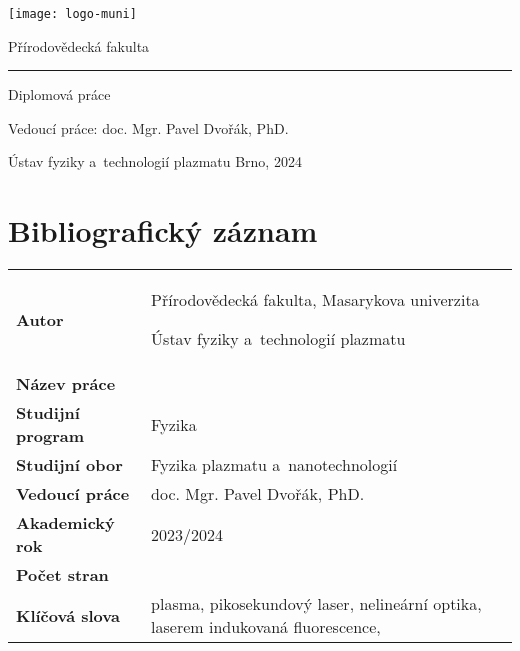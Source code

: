 \pagestyle{empty}

\sffamily
\begin{center}
	\texttt{[image: logo-muni]}
\end{center}
\begin{center}
	\huge Přírodovědecká fakulta
\end{center}
\hrule
\vfill

\begin{flushleft}
\huge\noindent
\textbf{\thetitle}
\end{flushleft}
\bigskip

\large\noindent
Diplomová práce
\bigskip

\Large\noindent
\theauthor
\vfill

\Large\noindent
Vedoucí práce: doc. Mgr. Pavel Dvořák, PhD.
\bigskip

\Large\noindent
Ústav fyziky a~technologií plazmatu
\hfill
Brno, 2024

\normalsize
\rmfamily
\cleardoublepage

\def\bibentryspacing{2}
\chapter*{Bibliografický záznam}
\thispagestyle{empty}
\bgroup
\renewcommand{\arraystretch}{\bibentryspacing}
\begin{tabularx}{\textwidth}{l X}
	\textbf{Autor}            & \theauthor\par
	                            Přírodovědecká fakulta,
	                            Masarykova univerzita\par
	                            Ústav fyziky a~technologií plazmatu \\
	\textbf{Název práce}      & \thetitle \\
	\textbf{Studijní program} & Fyzika \\
	\textbf{Studijní obor}    & Fyzika plazmatu a~nanotechnologií \\
	\textbf{Vedoucí práce}    & doc. Mgr. Pavel Dvořák, PhD. \\
	\textbf{Akademický rok}   & 2023/2024 \\
	\textbf{Počet stran}      & \pageref*{lastpage} \\
	\textbf{Klíčová slova}    & plasma, pikosekundový laser,
	                            nelineární optika,
	                            laserem indukovaná fluorescence,
	                            \EFISH{}\\
\end{tabularx}
\egroup
\cleardoublepage
